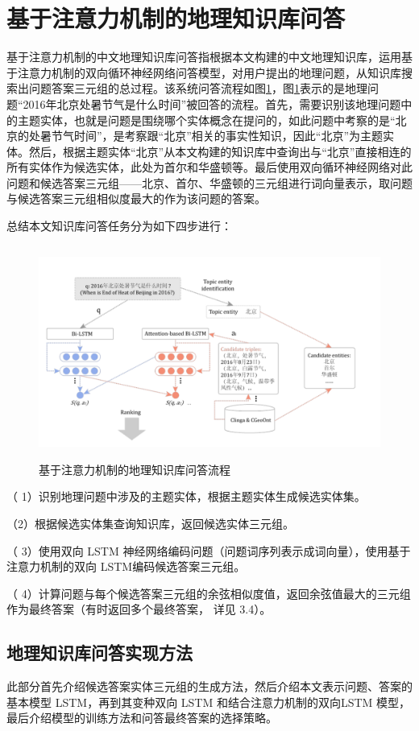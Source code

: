 \section{基于注意力机制的地理知识库问答}
基于注意力机制的中文地理知识库问答指根据本文构建的中文地理知识库，运用基于注意力机制的双向循环神经网络问答模型，对用户提出的地理问题，从知识库搜索出问题答案三元组的总过程。该系统问答流程如图\ref{fig:qa_overview}，图\ref{fig:qa_overview}表示的是地理问题“2016年北京处暑节气是什么时间”被回答的流程。首先，需要识别该地理问题中的主题实体，也就是问题是围绕哪个实体概念在提问的，如此问题中考察的是“北京的处暑节气时间”，是考察跟“北京”相关的事实性知识，因此“北京”为主题实体。然后，根据主题实体“北京”从本文构建的知识库中查询出与“北京”直接相连的所有实体作为候选实体，此处为首尔和华盛顿等。最后使用双向循环神经网络对此问题和候选答案三元组——北京、首尔、华盛顿的三元组进行词向量表示，取问题与候选答案三元组相似度最大的作为该问题的答案。

总结本文知识库问答任务分为如下四步进行：

\begin{figure}[!htb]
	\centering\includegraphics[height=7cm]{resource/qa_overview_1}
	\caption{基于注意力机制的地理知识库问答流程}
	\label{fig:qa_overview}
\end{figure}

（ 1）识别地理问题中涉及的主题实体，根据主题实体生成候选实体集。

（2）根据候选实体集查询知识库，返回候选实体三元组。

（ 3）使用双向 LSTM 神经网络编码问题（问题词序列表示成词向量），使用基于注意力机制的双向 LSTM编码候选答案三元组。

（ 4）计算问题与每个候选答案三元组的余弦相似度值，返回余弦值最大的三元组作为最终答案（有时返回多个最终答案， 详见 3.4）。

\subsection{地理知识库问答实现方法}
此部分首先介绍候选答案实体三元组的生成方法，然后介绍本文表示问题、答案的基本模型 LSTM，再到其变种双向 LSTM 和结合注意力机制的双向LSTM 模型，最后介绍模型的训练方法和问答最终答案的选择策略。

